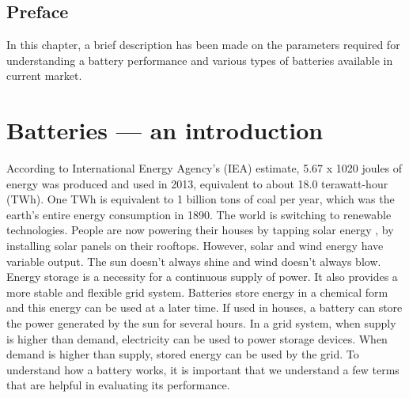 \section*{Preface}
In this chapter, a brief description has been made on the parameters required for understanding a battery performance and various types of batteries available in current market.
\pagebreak
\chapter{Batteries --- an introduction} %
 \label{chap1} %
\newcommand{\keyword}[1]{\textbf{#1}}
\newcommand{\tabhead}[1]{\textbf{#1}}
\newcommand{\code}[1]{\texttt{#1}}
\newcommand{\file}[1]{\texttt{\bfseries#1}}
\newcommand{\option}[1]{\texttt{\itshape#1}}

According to International Energy Agency's (IEA) estimate, 5.67 x 1020 joules of energy was produced and used in 2013, equivalent to about 18.0 terawatt-hour (TWh). One TWh is equivalent to 1 billion tons of coal per year, which was the earth's entire energy consumption in 1890. The world is switching to renewable technologies. People are now powering their houses by tapping solar energy , by installing solar panels on their rooftops. However, solar and wind energy have variable output. The sun doesn't always shine and wind doesn't always blow. Energy storage is a necessity for a continuous supply of power. It also provides a more stable and flexible grid system. Batteries store energy in a chemical form and this energy can be used at a later time. If used in houses, a battery can store the power generated by the sun for several hours. In a grid system, when supply is higher than demand, electricity can be used to power storage devices. When demand is higher than supply, stored energy can be used by the grid. To understand how a battery works, it is important that we understand a few terms that are helpful in evaluating its performance. 

